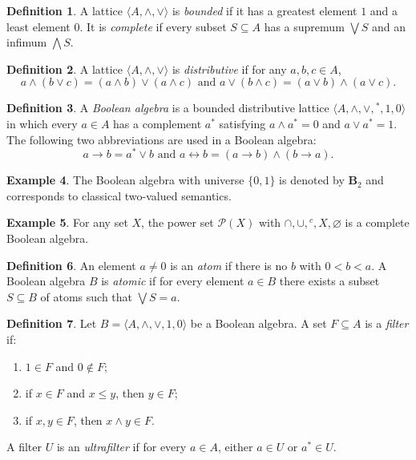 \documentclass[11pt]{amsart}
\theoremstyle{definition}
\newtheorem{definition}{Definition}[section]
\newtheorem{example}[definition]{Example}
\theoremstyle{plain}
\newcommand{\Pow}{\mathcal P}
\newcommand{\Btwo}{\mathbf{B}_2}
\begin{document}
\begin{definition}
A lattice $\langle A,\wedge,\vee\rangle$ is \emph{bounded} if it has a greatest element $1$ and
a least element $0$. It is \emph{complete} if every subset $S\subseteq A$ has a supremum $\bigvee S$ and an infimum $\bigwedge S$.
\end{definition}

\begin{definition}
A lattice $\langle A,\wedge,\vee\rangle$ is \emph{distributive} if for any $a, b, c \in A$,
\[a \wedge (b \vee c) = (a \wedge b) \vee (a \wedge c) \mbox{ and } a \vee (b \wedge c) = (a \vee b) \wedge (a \vee c).\]
\end{definition}

\begin{definition}
A \emph{Boolean algebra} is a bounded distributive lattice
$\langle A,\wedge,\vee,{}^\ast,1,0\rangle$ in which every $a\in A$ has a complement $a^\ast$
satisfying $a\wedge a^\ast=0$ and $a\vee a^\ast=1$. The following two abbreviations are used in a Boolean algebra:
\[a \to b = a^\ast \vee b \mbox{ and } a \leftrightarrow b = (a \to b) \wedge (b \to a).\]
\end{definition}

\begin{example}
The Boolean algebra with universe $\{0,1\}$ is denoted by $\Btwo$ and corresponds to classical
two-valued semantics.
\end{example}

\begin{example}
For any set $X$, the power set $\Pow(X)$ with $\cap,\cup,{}^c,X,\varnothing$ is a complete Boolean
algebra.
\end{example}

\begin{definition}
An element $a\ne 0$ is an \emph{atom} if there is no $b$ with $0<b<a$. A Boolean algebra $B$ is \emph{atomic} if for every element $a \in B$ there exists a subset $S \subseteq B$ of atoms such that $\bigvee S = a$.
\end{definition}

\begin{definition}\label{def:filter}
Let $B=\langle A,\wedge,\vee,1,0\rangle$ be a Boolean algebra.
A set $F\subseteq A$ is a \emph{filter} if:
\begin{enumerate}[label=(\roman*)]
\item $1\in F$ and $0\notin F$;
\item if $x\in F$ and $x\le y$, then $y\in F$;
\item if $x,y\in F$, then $x\wedge y\in F$.
\end{enumerate}
A filter $U$ is an \emph{ultrafilter} if for every $a\in A$, either $a\in U$ or $a^\ast\in U$.
\end{definition}
\end{document}
